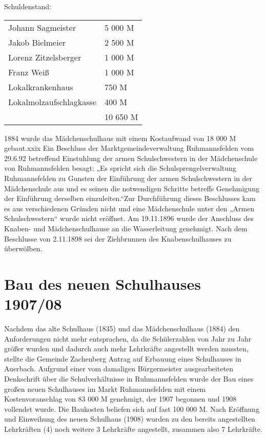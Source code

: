 \documentclass[12pt,a4paper]{book}
\begin{document}
Schuldenstand:

\begin{tabular}{ll}
Johann Sagmeister & 5 000 M \\
Jakob Bielmeier & 2 500 M \\
Lorenz Zitzelsberger & 1 000 M \\
Franz Weiß & 1 000 M \\
Lokalkrankenhaus & 750 M \\
Lokalmolzaufschlagkasse & 400 M \\
\hline
& 10 650 M  \\
\end{tabular}

1884 wurde das Mädchenschulhaus mit einem Kostaufwand von 18 000 M gebaut.xxix
Ein Beschluss der Marktgemeindeverwaltung Ruhmannsfelden vom 29.6.92 betreffend
Einstuhlung der armen Schulschwestern in der Mädchenschule von Ruhmannsfelden
besagt: „Es spricht sich die Schulsprengelverwaltung Ruhmannsfelden zu Gunsten
der Einführung der armen Schulschwestern in der Mädchenschule aus und es seinen
die notwendigen Schritte betreffs Genehmigung der Einführung derselben
einzuleiten.“Zur Durchführung dieses Beschlusses kam es aus verschiedenen
Gründen nicht und eine Mädchenschule unter den „Armen Schulschwestern“ wurde
nicht eröffnet. Am 19.11.1896 wurde der Anschluss des Knaben- und
Mädchenschulhause an die Wasserleitung genehmigt. Nach dem Beschlusse von
2.11.1898 sei der Ziehbrunnen des Knabenschulhauses zu überwölben.

\section{Bau des neuen Schulhauses 1907/08}

Nachdem das alte Schulhaus (1835) und das Mädchenschulhaus (1884) den
Anforderungen nicht mehr entsprachen, da die Schülerzahlen von Jahr zu Jahr
größer wurden und dadurch auch mehr Lehrkräfte angestellt werden mussten,
stellte die Gemeinde Zachenberg Antrag auf Erbauung eines Schulhauses in
Auerbach. Aufgrund einer vom damaligen Bürgermeister ausgearbeiteten Denkschrift
über die Schulverhältnisse in Ruhmannsfelden wurde der Bau eines großen neuen
Schulhauses im Markt Ruhmannsfelden mit einem Kostenvoranschlag von 83 000 M
genehmigt, der 1907 begonnen und 1908 vollendet wurde. Die Baukosten beliefen
sich auf fast 100 000 M. Nach Eröffnung und Einweihung des neuen Schulhaus
(1908) wurden zu den bereits angestellten Lehrkräften (4) noch weitere 3
Lehrkräfte angestellt, zusammen also 7 Lehrkräfte.
\end{document}

